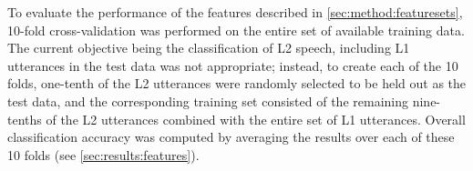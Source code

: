 \documentclass[a4paper]{article}
\begin{document}
		To evaluate the performance of the features described in \cref{sec:method:featuresets}, 10-fold cross-validation was performed on the entire set of available training data. The current objective being the classification of L2 speech, including L1 utterances in the test data was not appropriate; instead, to create each of the 10 folds, one-tenth of the L2 utterances were randomly selected to be held out as the test data, and the corresponding training set consisted of the remaining nine-tenths of the L2 utterances combined with the entire set of L1 utterances. Overall classification accuracy was computed by averaging the results over each of these 10 folds (see \cref{sec:results:features}).
		
\end{document}
